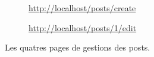 \begin{figure}[!h]
\begin{subfigure}[c]{0.55\textwidth}
    \end{subfigure}\hfill
    \begin{subfigure}[c]{0.40\textwidth}
        \caption{\url{http://localhost/posts/create}} 
    \end{subfigure}
    \begin{subfigure}[c]{0.55\textwidth}
    \end{subfigure}\hfill
    \begin{subfigure}[c]{0.40\textwidth}
        \caption{\url{http://localhost/posts/1/edit}}
    \end{subfigure}
    \caption{Les quatres pages de gestions des posts.}
\end{figure}

\newpage

